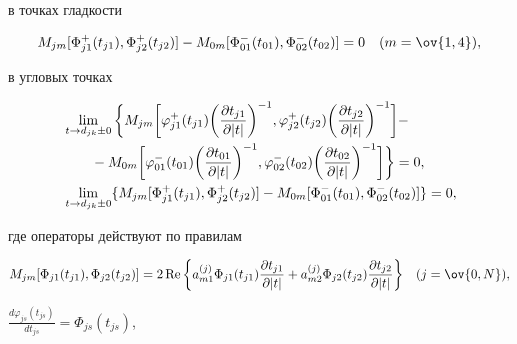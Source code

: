  


\noindent{}в точках гладкости 


\begin{equation} 


M_{jm}[\Phi^+_{j1}(t_{j1}),\Phi^+_{j2}(t_{j2})]- 


M_{0m}[\Phi^-_{01}(t_{01}),\Phi^-_{02}(t_{02})]=0 


\quad (m=\ov{1,4}), 


\end{equation} 


в угловых точках 


\begin{align} 


&\lim_{t\to d_{jk}\pm0}\bigg\{M_{jm}\bigg[\varphi^+_{j1} 


(t_{j1})\bigg(\frac{\partial t_{j1}}{\partial|t|}\bigg)^{-1}, 


\varphi^+_{j2}(t_{j2})\bigg(\frac{\partial t_{j2}}{\partial|t|} 


\bigg)^{-1}\bigg]- \notag\\ 


%


&\qquad -M_{0m}\bigg[\varphi^-_{01}(t_{01}) 


\bigg(\frac{\partial t_{01}}{\partial|t|}\bigg)^{-1}, 


\varphi^-_{02}(t_{02})\bigg( 


\frac{\partial t_{02}}{\partial|t|}\bigg)^{-1}\bigg]\bigg\}=0,\\ 


% 


&\lim_{t\to d_{jk}\pm0}\{M_{jm}[\Phi^+_{j1}(t_{j1}), 


\Phi^+_{j2}(t_{j2})]-M_{0m}[\Phi^-_{01}(t_{01}), 


\Phi^-_{02}(t_{02})]\}=0, 


\end{align} 


где операторы действуют по правилам 


$$ 


M_{jm}[\Phi_{j1}(t_{j1}),\Phi_{j2}(t_{j2})]=2\re 


\bigg\{a^{(j)}_{m1}\Phi_{j1}(t_{j1}) 


\frac{\partial t_{j1}}{\partial|t|}+a^{(j)}_{m2} 


\Phi_{j2}(t_{j2})\frac{\partial t_{j2}}{\partial|t|}\bigg\} 


\quad (j=\ov{0,N}), 


$$ 


$\frac{d\varphi_{js}(t_{js})}{d t_{js}}=\Phi_{js}(t_{js})$, 


